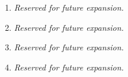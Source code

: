\documentclass{article}
\begin{document}
\begin{itemize}
\begin{enumerate}
			\item \textit{Reserved for future expansion.}
			\item \textit{Reserved for future expansion.}
			\item \textit{Reserved for future expansion.}
			\item \textit{Reserved for future expansion.}


\end{enumerate}
\end{itemize}
\end{document}
